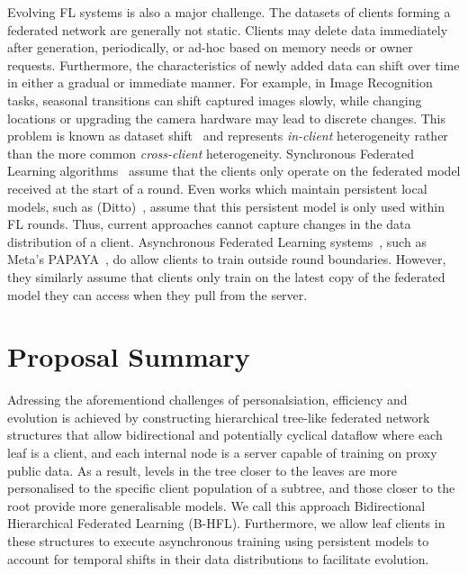 Evolving FL systems is also a major challenge. The datasets of clients forming a federated network are generally not static. Clients may delete data immediately after generation, periodically, or ad-hoc based on memory needs or owner requests. Furthermore, the characteristics of newly added data can shift over time in either a gradual or immediate manner. For example, in Image Recognition tasks, seasonal transitions can shift captured images slowly, while changing locations or upgrading the camera hardware may lead to discrete changes. This problem is known as dataset shift~\citep[sec. 3.1]{AdvancedAndOpenProblems} and represents \emph{in-client} heterogeneity rather than the more common \emph{cross-client} heterogeneity. Synchronous Federated Learning algorithms~\citep{FedAvg,FedOPT,FedMA,QFedAvg,TERM} assume that the clients only operate on the federated model received at the start of a round. Even works which maintain persistent local models, such as (Ditto)~\citep{Ditto}, assume that this persistent model is only used within FL rounds. Thus, current approaches cannot capture changes in the data distribution of a client. Asynchronous Federated Learning systems~\citep{AsynchronousFLonHetDevicesSurvey,FedBuff,AsyncrhonousOnlineFL}, such as Meta's PAPAYA~\citep{PAPAYA}, do allow clients to train outside round boundaries. However, they similarly assume that clients only train on the latest copy of the federated model they can access when they pull from the server.

\section{Proposal Summary}

Adressing the aforementiond challenges of personalsiation, efficiency and evolution is achieved by constructing hierarchical tree-like federated network structures that allow bidirectional and potentially cyclical dataflow where each leaf is a client, and each internal node is a server capable of training on proxy public data. As a result, levels in the tree closer to the leaves are more personalised to the specific client population of a subtree, and those closer to the root provide more generalisable models. We call this approach Bidirectional Hierarchical Federated Learning (B-HFL). Furthermore, we allow leaf clients in these structures to execute asynchronous training using persistent models to account for temporal shifts in their data distributions to facilitate evolution.


